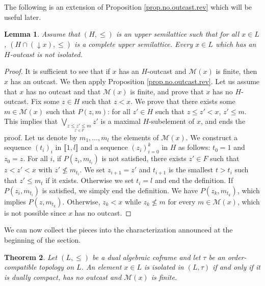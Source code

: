 \documentclass{article}
\newtheorem{theorem}{Theorem}[section]
\newtheorem{lemma}[theorem]{Lemma}
\begin{document}
The following is an extension of Proposition \ref{prop.no.outcast.rev} which will be useful later.

\begin{lemma}\label{lemma.f.outcast}
     Assume that $(H,\le)$ is an upper semilattice such that for all $x \in L$, $(H\cap (\mathop{\downarrow}x),\le)$ is a complete upper semilattice. Every $x \in L$ which has an $H$-outcast is not isolated.
\end{lemma}

\begin{proof}
    It is sufficient to see that if $x$ has an $H$-outcast and $\mathcal{M}(x)$ is finite, then $x$ has an outcast. We then  
    apply Proposition \ref{prop.no.outcast.rev}. 
    Let us assume that $x$ has no outcast and that $\mathcal{M}(x)$ is finite, and prove that $x$ has no $H$-outcast.
    Fix some $z \in H$ such that $z < x$. We prove that there exists some $m \in \mathcal{M}(x)$ such that $P(z,m)$: for all $z' \in H$ such that $z \le z' < x$, $z' \le m$. 
    This implies that $\bigvee_{\underset{z' \in F}{z \le z' \le m}} z'$ is a maximal $H$-subelement of $x$, and ends the proof.
    Let us denote by $m_1 , \ldots , m_l$ the elements of $\mathcal{M}(x)$. We construct a sequence 
    $(t_i)_i$ in $\llbracket 1 , l \rrbracket$ and a sequence $(z_i)_{i=0}^k$ in $H$ as follows:  $t_0 = 1$ and $z_0 = z$. For all $i$, if $P(z_i,m_{t_i})$ is not satisfied, there exists $z' \in F$ such that $z < z' < x$ with $z' \not \le m_{t_i}$. We set $z_{i+1} = z'$ and $t_{i+1}$ is the smallest $t > t_i$ such that $z' \le m_{t}$ if it exists. Otherwise we set $t_i = l$ and end the definition. If $P(z_i,m_{t_i})$ is satisfied, we simply end the definition. 
    We have $P(z_{k},m_{t_k})$, which implies $P(z,m_{t_k})$. Otherwise, $z_k < x$ while $z_k \not \le m$ for every $m \in \mathcal{M}(x)$, which is not possible since $x$ has no outcast.
\end{proof}


We can now collect the pieces into the characterization announced at the beginning of the section.

\begin{theorem}\label{thm.characterization.isolated}
Let $(L,\le)$ be a dual algebraic coframe and let $\tau$ be an order-compatible topology on $L$. An element $x\in L$ is isolated in $(L,\tau)$ if and only if {it is dually compact}, has no outcast and $\mathcal M(x)$ is finite.
\end{theorem}
\end{document}

